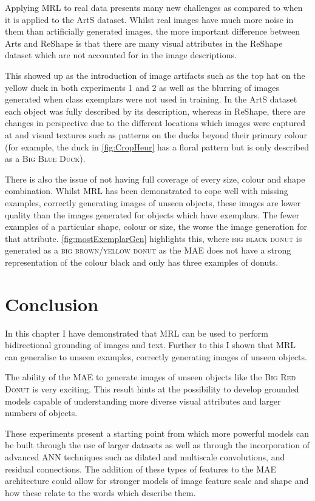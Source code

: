 Applying \ac{MRL} to real data presents many new challenges as compared to when it is applied to the ArtS dataset. Whilst real images have much more noise in them than artificially generated images, the more important difference between Arts and ReShape is that there are many visual attributes in the ReShape dataset which are not accounted for in the image descriptions.

This showed up as the introduction of image artifacts such as the top hat on the yellow duck in both experiments 1 and 2 as well as the blurring of images generated when class exemplars were not used in training. In the ArtS dataset each object was fully described by its description, whereas in ReShape, there are changes in perspective due to the different locations which images were captured at and visual textures such as patterns on the ducks beyond their primary colour (for example, the duck in \autoref{fig:CropHeur} has a floral pattern but is only described as a \textsc{Big Blue Duck}).

There is also the issue of not having full coverage of every size, colour and shape combination. Whilst \ac{MRL} has been demonstrated to cope well with missing examples, correctly generating images of unseen objects, these images are lower quality than the images generated for objects which have exemplars. The fewer examples of a particular shape, colour or size, the worse the image generation for that attribute. \autoref{fig:mostExemplarGen} highlights this, where \textsc{big black donut} is generated as a \textsc{big brown/yellow donut} as the MAE does not have a strong representation of the colour black and only has three examples of donuts.



\section{Conclusion}
In this chapter I have demonstrated that \ac{MRL} can be used to perform bidirectional grounding of images and text. Further to this I shown that \ac{MRL} can generalise to unseen examples, correctly generating images of unseen objects.

The ability of the \ac{MAE} to generate images of unseen objects like the \textsc{Big Red Donut} is very exciting. This result hints at the possibility to develop grounded models capable of understanding more diverse visual attributes and larger numbers of objects.

These experiments present a starting point from which more powerful models can be built through the use of larger datasets as well as through the incorporation of advanced  \ac{ANN} techniques such as dilated and multiscale convolutions, and residual connections. The addition of these types of features to the \ac{MAE} architecture could allow for stronger models of image feature scale and shape and how these relate to the words which describe them.
\theendnotes